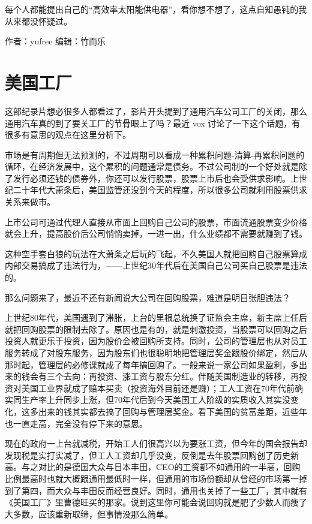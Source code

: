 \documentclass[]{book}
\begin{document}
每个人都能提出自己的``高效率太阳能供电器''，看你想不想了，这点自知愚钝的我从来都没怀疑过。

作者：yufree
编辑：竹而乐

\hypertarget{ux7f8eux56fdux5de5ux5382}{%
\section{美国工厂}\label{ux7f8eux56fdux5de5ux5382}}

这部纪录片想必很多人都看过了，影片开头提到了通用汽车公司工厂的关闭，那么通用汽车真的到了要关工厂的节⻣眼上了吗？最近 vox 讨论了一下这个话题，有很多有意思的观点在这里分析下。

市场是有周期但无法预测的，不过周期可以看成一种累积问题-清算-再累积问题的循环，在经济发展中，这个累积的问题通常是债务。不过公司制的一个好处就是除了发行必须还钱的债券外，你还可以发行股票，股票上市后也会受供求影响。上世纪二十年代大萧条后，美国监管还没到今天的程度，所以很多公司就利用股票供求关系来做市。

上市公司可通过代理人直接从市面上回购自己公司的股票，市面流通股票变少价格就会上升，提高股价后公司悄悄卖掉，一进一出，什么业绩都不需要就赚到了钱。

这种空手套白狼的玩法在大萧条之后玩的飞起，不久美国人就把回购自己股票算成内部交易搞成了违法行为，------上世纪30年代后在美国自己公司买自己股票是违法的。

那么问题来了，最近不还有新闻说大公司在回购股票，难道是明目张胆违法？

上世纪80年代，美国遇到了滞胀，上台的里根总统换了证监会主席，新主席上任后就把回购股票的限制去除了。原因也是有的，就是刺激投资，当股票可以回购之后投资人就更乐于投资，因为股价会被回购所支持。同时，公司的管理层也从对员工服务转成了对股东服务，因为股东们也很聪明地把管理层奖金跟股价绑定，然后从那时起，管理层的必修课就成了每年搞回购了。一般来说一家公司如果盈利，多出来的钱会有三个去向：再投资、涨工资与股东分红。伴随美国制造业的转移，再投资对美国工业界就成了赔本买卖（投资海外目前还是赚）；工人工资在70年代前确实同生产率上升同步上涨，但70年代后到今天美国工人阶级的实质收入其实没变化，这多出来的钱其实都去搞了回购与管理层奖金。看下美国的贫富差距，近些年也一直走高，完全没有停下来的意思。

现在的政府一上台就减税，开始工人们很高兴以为要涨工资，但今年的国会报告却发现税是实打实减了，但工人工资却几乎没变，反倒是去年股票回购创了历史新高。与之对比的是德国大众与日本丰田，CEO的工资都不如通用的一半高，回购比例最高时也就大概跟通用最低时一样，但通用的市场份额却从曾经的市场第一掉到了第四，而大众与丰田反而经营良好。同时，通用也关掉了一些工厂，其中就有《美国工厂》里曹德旺买的那家。说到这里你可能会说回购就是肥了少数人而瘦了大多数，应该重新取缔，但事情没那么简单。
\end{document}
